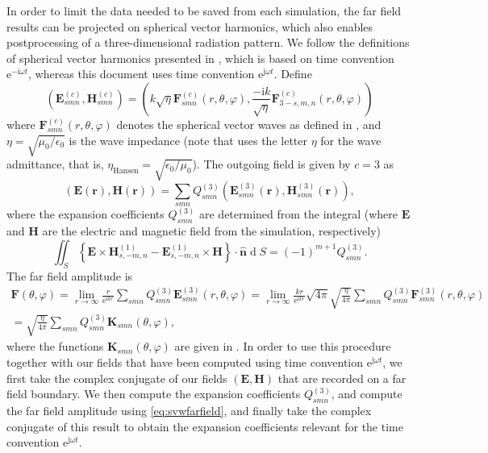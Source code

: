 \documentclass[a4paper,12pt]{article}
\renewcommand{\vec}[1]{\boldsymbol{#1}}
\newcommand{\unitvec}[1]{\hat{\vec{#1}}}
\newcommand{\mrm}[1]{\mathrm{#1}}
\newcommand{\diff}{\operatorname{d}\!}
\newcommand{\iu}{\mrm{i}}
\newcommand{\ju}{\mrm{j}}
\newcommand{\eu}{\mrm{e}}
\newcommand{\Ev}{\vec{E}}
\newcommand{\Hv}{\vec{H}}
\newcommand{\Fv}{\vec{F}}
\newcommand{\Kv}{\vec{K}}
\newcommand{\rv}{\vec{r}}
\newcommand{\nuv}{\unitvec{n}}
\begin{document}
In order to limit the data needed to be saved from each simulation,
the far field results can be projected on spherical vector harmonics,
which also enables postprocessing of a three-dimensional radiation
pattern. We follow the definitions of spherical vector harmonics
presented in \cite{Hansen1988}, which is based on time convention
$\eu^{-\iu\omega t}$, whereas this document uses time convention
$\eu^{\ju\omega t}$. Define
\begin{equation}
  (\Ev_{smn}^{(c)},\Hv_{smn}^{(c)}) = \left(k\sqrt{\eta}\Fv_{smn}^{(c)}(r,\theta,\varphi), \frac{-\iu k}{\sqrt{\eta}}\Fv_{3-s,m,n}^{(c)}(r,\theta,\varphi)\right)
\end{equation}
where $\Fv_{smn}^{(c)}(r,\theta,\varphi)$ denotes the spherical vector
waves as defined in \cite{Hansen1988}, and
$\eta=\sqrt{\mu_{0}/\epsilon_{0}}$ is the wave impedance (note that
\cite{Hansen1988} uses the letter $\eta$ for the wave admittance, that
is, $\eta_{\mrm{Hansen}} = \sqrt{\epsilon_{0}/\mu_{0}}$). The outgoing
field is given by $c=3$ as
\begin{equation}
  (\Ev(\rv),\Hv(\rv)) = \sum_{smn}Q_{smn}^{(3)}(\Ev_{smn}^{(3)}(\rv),\Hv_{smn}^{(3)}(\rv)),
\end{equation}
where the expansion coefficients $Q_{smn}^{(3)}$ are determined from
the integral (where $\Ev$ and $\Hv$ are the electric and magnetic
field from the simulation, respectively)
\begin{equation}
  \iint_{S}\left\{\Ev\times\Hv_{s,-m,n}^{(1)} - \Ev_{s,-m,n}^{(1)}\times\Hv\right\} \cdot \nuv \diff S = (-1)^{m+1}Q_{smn}^{(3)}.
\end{equation}
The far field amplitude is
\begin{multline}
  \Fv(\theta,\varphi) = \lim_{r\rightarrow\infty}\frac{r}{\eu^{\iu kr}}\sum_{smn}Q_{smn}^{(3)}\Ev_{smn}^{(3)}(r,\theta,\varphi) = \lim_{r\rightarrow\infty} \frac{kr}{\eu^{\iu kr}}\sqrt{4\pi}\sqrt{\frac{\eta}{4\pi}} \sum_{smn}Q_{smn}^{(3)}\Fv_{smn}^{(3)}(r,\theta,\varphi) \\
  = \sqrt{\frac{\eta}{4\pi}}\sum_{smn}Q_{smn}^{(3)}\Kv_{smn}(\theta,\varphi),
  \label{eq:svwfarfield}
\end{multline}
where the functions $\Kv_{smn}(\theta,\varphi)$ are given in
\cite{Hansen1988}.  In order to use this procedure together with our
fields that have been computed using time convention
$\eu^{\ju\omega t}$, we first take the complex conjugate of our fields
$(\Ev,\Hv)$ that are recorded on a far field boundary. We then compute
the expansion coefficients $Q_{smn}^{(3)}$, and compute the far field
amplitude using \eqref{eq:svwfarfield}, and finally take the complex
conjugate of this result to obtain the expansion coefficients relevant
for the time convention $\eu^{\ju\omega t}$.
\end{document}
